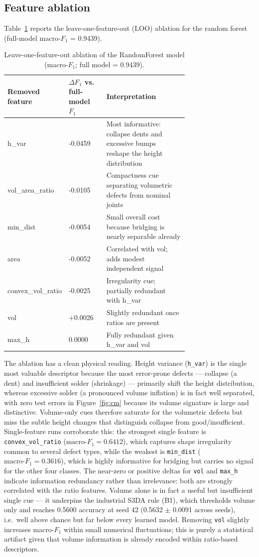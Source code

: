 \documentclass[3p]{elsarticle}
\begin{document}
\subsection{Feature ablation}
Table~\ref{tab:loo} reports the leave-one-feature-out (LOO) ablation for the random forest (full-model macro-$F_1$ = 0.9439).
\begin{table}[htbp]
\centering
\caption{Leave-one-feature-out ablation of the RandomForest model (macro-$F_1$; full model = 0.9439).}
\label{tab:loo}
\begin{tabular}{lp{0.22\linewidth}p{0.50\linewidth}}
\toprule
\textbf{Removed feature} & \textbf{$\Delta F_1$ vs. full-model $F_1$} & \textbf{Interpretation} \\
\midrule
h\_var & -0.0459 & Most informative: collapse dents and excessive bumps reshape the height distribution \\
vol\_area\_ratio & -0.0105 & Compactness cue separating volumetric defects from nominal joints \\
min\_dist & -0.0054 & Small overall cost because bridging is nearly separable already \\
area & -0.0052 & Correlated with vol; adds modest independent signal \\
convex\_vol\_ratio & -0.0025 & Irregularity cue; partially redundant with h\_var \\
vol & +0.0026 & Slightly redundant once ratios are present \\
max\_h & 0.0000 & Fully redundant given h\_var and vol \\
\bottomrule
\end{tabular}
\end{table}
The ablation has a clean physical reading. Height variance (\texttt{h\_var}) is the single most valuable descriptor because the most error-prone defects --- collapse (a dent) and insufficient solder (shrinkage) --- primarily shift the height distribution, whereas excessive solder (a pronounced volume inflation) is in fact well separated, with zero test errors in Figure~\ref{fig:cm} because its volume signature is large and distinctive. Volume-only cues therefore saturate for the volumetric defects but miss the subtle height changes that distinguish collapse from good/insufficient. Single-feature runs corroborate this: the strongest single feature is \texttt{convex\_vol\_ratio} ($\text{macro-}F_1=0.6412$), which captures shape irregularity common to several defect types, while the weakest is \texttt{min\_dist} ($\text{macro-}F_1=0.3616$), which is highly informative for bridging but carries no signal for the other four classes. The near-zero or positive deltas for \texttt{vol} and \texttt{max\_h} indicate information redundancy rather than irrelevance: both are strongly correlated with the ratio features. Volume alone is in fact a useful but insufficient single cue --- it underpins the industrial S3DA rule (B1), which thresholds volume only and reaches 0.5600 accuracy at seed 42 (0.5632 $\pm$ 0.0091 across seeds), i.e.\ well above chance but far below every learned model. Removing \texttt{vol} slightly increases macro-$F_1$ within small numerical fluctuations; this is purely a statistical artifact given that volume information is already encoded within ratio-based descriptors.
\end{document}
